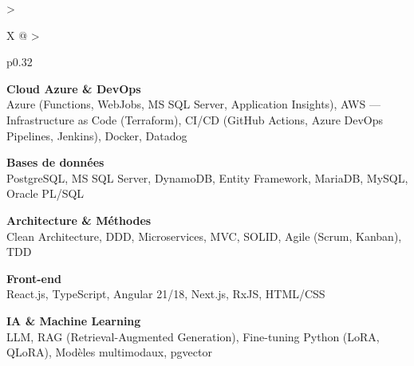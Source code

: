 \documentclass[10pt,a4paper]{article}
\begin{document}
\begin{tabularx}{\textwidth}{
  >{\raggedright\arraybackslash}X
  @{\hspace{1cm}}
  >{\raggedright\arraybackslash}p{0.32\textwidth}
}
\begin{minipage}[t]{\linewidth}
\vspace{4pt}

\textbf{\color{primary} Cloud Azure \& DevOps}\\
\color{darkgray} Azure (Functions, WebJobs, MS SQL Server, Application Insights), AWS --- Infrastructure as Code (Terraform), CI/CD (GitHub Actions, Azure DevOps Pipelines, Jenkins), Docker, Datadog

\vspace{4pt}

\textbf{\color{primary} Bases de données}\\
\color{darkgray} PostgreSQL, MS SQL Server, DynamoDB, Entity Framework, MariaDB, MySQL, Oracle PL/SQL

\vspace{4pt}

\textbf{\color{primary} Architecture \& Méthodes}\\
\color{darkgray} Clean Architecture, DDD, Microservices, MVC, SOLID, Agile (Scrum, Kanban), TDD

\vspace{4pt}

\textbf{\color{primary} Front-end}\\
\color{darkgray} React.js, TypeScript, Angular 21/18, Next.js, RxJS, HTML/CSS

\vspace{4pt}

\textbf{\color{primary} IA \& Machine Learning}\\
\color{darkgray} LLM, RAG (Retrieval-Augmented Generation), Fine-tuning Python (LoRA, QLoRA), Modèles multimodaux, pgvector

\vspace{4pt}

\end{minipage}
\\
\end{tabularx}
\end{document}
